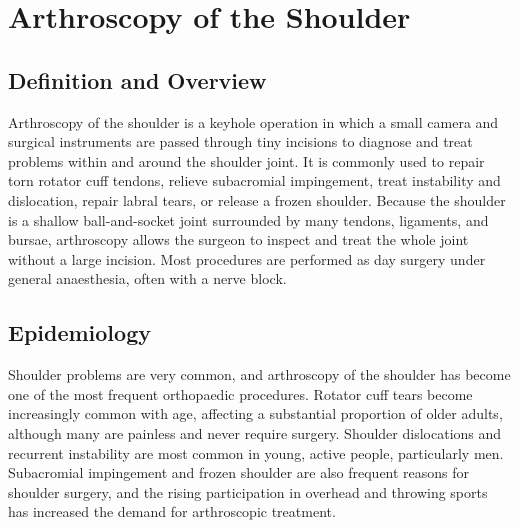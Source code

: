 \chapter{Arthroscopy of the Shoulder}

\section*{Definition and Overview}
Arthroscopy of the shoulder is a keyhole operation in which a small camera and surgical instruments are passed through tiny incisions to diagnose and treat problems within and around the shoulder joint. It is commonly used to repair torn rotator cuff tendons, relieve subacromial impingement, treat instability and dislocation, repair labral tears, or release a frozen shoulder. Because the shoulder is a shallow ball-and-socket joint surrounded by many tendons, ligaments, and bursae, arthroscopy allows the surgeon to inspect and treat the whole joint without a large incision. Most procedures are performed as day surgery under general anaesthesia, often with a nerve block.

\section*{Epidemiology}
Shoulder problems are very common, and arthroscopy of the shoulder has become one of the most frequent orthopaedic procedures. Rotator cuff tears become increasingly common with age, affecting a substantial proportion of older adults, although many are painless and never require surgery. Shoulder dislocations and recurrent instability are most common in young, active people, particularly men. Subacromial impingement and frozen shoulder are also frequent reasons for shoulder surgery, and the rising participation in overhead and throwing sports has increased the demand for arthroscopic treatment.


